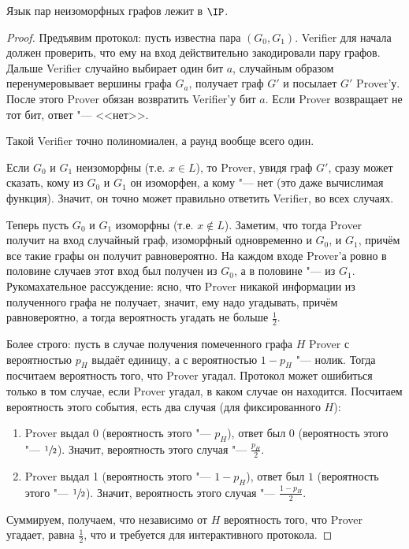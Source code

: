 	\begin{theorem}
		Язык пар неизоморфных графов лежит в $\IP$.
	\end{theorem}
	\begin{proof}
		Предъявим протокол: пусть известна пара $(G_0, G_1)$.
		Verifier для начала должен проверить, что ему на вход действительно закодировали пару графов.
		Дальше Verifier случайно выбирает один бит $a$, случайным образом перенумеровывает вершины графа $G_a$, получает граф $G'$ и посылает $G'$ Prover'у.
		После этого Prover обязан возвратить Verifier'у бит $a$.
		Если Prover возвращает не тот бит, ответ "--- <<нет>>.
		
		Такой Verifier точно полиномиален, а раунд вообще всего один.

		Если $G_0$ и $G_1$ неизоморфны (т.е. $x \in L$), то Prover, увидя граф $G'$, сразу может сказать, кому из $G_0$ и $G_1$ он изоморфен, а кому "--- нет (это даже вычислимая функция).
		Значит, он точно может правильно ответить Verifier, во всех случаях.

		Теперь пусть $G_0$ и $G_1$ изоморфны (т.е. $x \notin L$).
		Заметим, что тогда Prover получит на вход случайный граф, изоморфный одновременно и $G_0$, и $G_1$, причём все такие графы он получит равновероятно.
		На каждом входе Prover'а ровно в половине случаев этот вход был получен из $G_0$, а в половине "--- из $G_1$.
		Рукомахательное рассуждение: ясно, что Prover никакой информации из полученного графа не получает, значит, ему надо угадывать, причём равновероятно, а тогда вероятность угадать не больше $\frac 12$.

		Более строго:
		пусть в случае получения помеченного графа $H$ Prover с вероятностью $p_{H}$ выдаёт единицу, а с вероятностью $1-p_{H}$ "--- нолик.
		Тогда посчитаем вероятность того, что Prover угадал.
		Протокол может ошибиться только в том случае, если Prover угадал, в каком случае он находится.
		Посчитаем вероятность этого события, есть два случая (для фиксированного $H$):
		\begin{enumerate}
			\item Prover выдал 0 (вероятность этого "--- $p_H$), ответ был $0$ (вероятность этого "--- $\sfrac 12$).
				Значит, вероятность этого случая "--- $\frac{p_H}{2}$.
			\item Prover выдал 1 (вероятность этого "--- $1-p_H$), ответ был $1$ (вероятность этого "--- $\sfrac 12$).
				Значит, вероятность этого случая "--- $\frac{1-p_H}{2}$.
		\end{enumerate}
		Суммируем, получаем, что независимо от $H$ вероятность того, что Prover угадает, равна $\frac 12$, что и требуется для интерактивного протокола.
	\end{proof}

